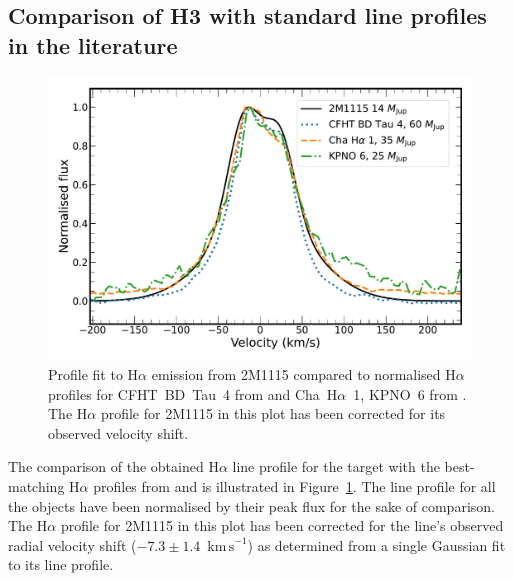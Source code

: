 \documentclass{aa}
\newcommand{\Ha}{\ensuremath{\mathrm{H}\alpha}\xspace}
\newcommand{\kms}{\ensuremath{\mathrm{km\,s}^{-1}}\xspace}
\begin{document}
\begin{appendix}
\section{Comparison of H3 with standard line profiles in the literature} \label{H3comp}
\begin{figure}
    \centering
    \includegraphics[width=1.0\linewidth, trim = {0.5cm 0cm 0.2cm 0.5cm}, clip]{H3_profile_comparison.pdf}
    \caption{Profile fit to \Ha emission from 2M1115 compared to normalised \Ha profiles for CFHT~BD~Tau~4 from \cite{mohanty2005} and Cha~\Ha~1, KPNO~6 from \cite{muzerolle2005}. The \Ha profile for 2M1115 in this plot has been corrected for its observed velocity shift.}
    \label{apfig6}
\end{figure}

The comparison of the obtained \Ha line profile for the target with the best-matching \Ha profiles from \cite{muzerolle2005} and \cite{mohanty2005} is illustrated in Figure~\ref{apfig6}. The line profile for all the objects have been normalised by their peak flux for the sake of comparison. The \Ha profile for 2M1115 in this plot has been corrected for the line's observed radial velocity shift ($-7.3\pm1.4$~\kms) as determined from a single Gaussian fit to its line profile.



\end{appendix}
\end{document}
